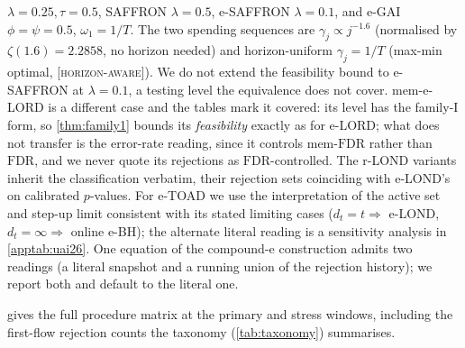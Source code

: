 \documentclass[conference]{IEEEtran}
\newcommand{\FDR}{\mathrm{FDR}}
\newcommand{\oracle}{\textsc{[horizon-aware]}}
\begin{document}
$\lambda=0.25,\tau=0.5$, SAFFRON $\lambda=0.5$, e-SAFFRON $\lambda=0.1$, and e-GAI $\phi=\psi=0.5$,
$\omega_1=1/T$. The two spending sequences are $\gamma_j\propto j^{-1.6}$ (normalised by
$\zeta(1.6)=2.2858$, no horizon needed) and horizon-uniform $\gamma_j=1/T$ (max-min optimal, \oracle).
We do not extend the feasibility bound to e-SAFFRON at $\lambda=0.1$, a testing level the equivalence
does not cover. mem-e-LORD is a different case and the tables mark it covered: its level has the family-I
form, so \cref{thm:family1} bounds its \emph{feasibility} exactly as for e-LORD; what does not transfer
is the error-rate reading, since it controls mem-$\FDR$ rather than $\FDR$, and we never quote its
rejections as $\FDR$-controlled. The r-LOND variants inherit the classification
verbatim, their rejection sets coinciding with e-LOND's on calibrated $p$-values. For e-TOAD we use the
interpretation of the active set and step-up limit consistent with its stated limiting cases
($d_t=t\Rightarrow$ e-LOND, $d_t=\infty\Rightarrow$ online e-BH); the alternate literal reading is a
sensitivity analysis in \cref{apptab:uai26}. One equation of the compound-e construction admits two
readings (a literal snapshot and a running union of the rejection history); we report both and default
to the literal one.

 gives the full procedure matrix at the primary and stress windows, including the
first-flow rejection counts the taxonomy (\cref{tab:taxonomy}) summarises.
\end{document}
